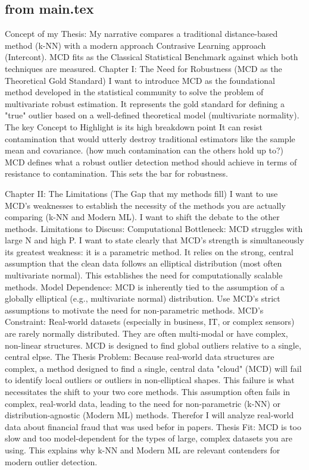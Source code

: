 

\subsection{from main.tex}
Concept of my Thesis:
My narrative compares a traditional distance-based method (k-NN) with a modern approach Contrasive Learning approach (Intercont). 
MCD fits as the Classical Statistical Benchmark against which both techniques are measured.
Chapter I: The Need for Robustness (MCD as the Theoretical Gold Standard)
I want to introduce MCD as the foundational method developed in the statistical community to solve the problem of multivariate robust estimation.
It represents the gold standard for defining a "true" outlier based on a well-defined theoretical model (multivariate normality).
The key Concept to Highlight is its high breakdown point %
It can resist contamination that would utterly destroy traditional estimators like the sample mean and covariance. (how much contamination can the others hold up to?)
MCD defines what a robust outlier detection method should achieve in terms of resistance to contamination. 
This sets the bar for robustness.


Chapter II: The Limitations (The Gap that my methods fill)
I want to use MCD's weaknesses to establish the necessity of the methods you are actually comparing (k-NN and Modern ML).
I want to shift the debate to the other methods.
Limitations to Discuss:
Computational Bottleneck: MCD struggles with large N and high P.
I want to state clearly that MCD's strength is simultaneously its greatest weakness: it is a parametric method.
It relies on the strong, central assumption that the clean data follows an elliptical distribution (most often multivariate normal). 
This establishes the need for computationally scalable methods.
Model Dependence: MCD is inherently tied to the assumption of a globally elliptical (e.g., multivariate normal) distribution. 
Use MCD's strict assumptions to motivate the need for non-parametric methods.
MCD's Constraint: Real-world datasets (especially in business, IT, or complex sensors) are rarely normally distributed. 
They are often multi-modal or have complex, non-linear structures. MCD is designed to find global outliers relative to a single, central elpse.
The Thesis Problem: Because real-world data structures are complex, a method designed to find a single, central data "cloud" (MCD) will fail to identify local outliers or outliers
in non-elliptical shapes. 
This failure is what necessitates the shift to your two core methods.
This assumption often fails in complex, real-world data, leading to the need for non-parametric (k-NN) or distribution-agnostic (Modern ML) methods.
Therefor I will analyze real-world data about financial fraud that was used befor in papers.
Thesis Fit: MCD is too slow and too model-dependent for the types of large, complex datasets you are using.
This explains why k-NN and Modern ML are relevant contenders for modern outlier detection.


